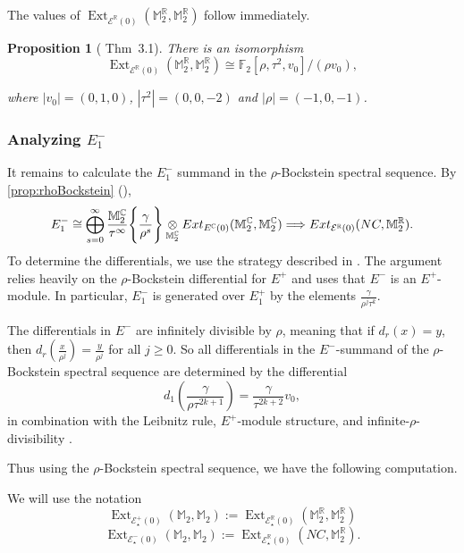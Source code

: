 \documentclass{amsart}
\newtheorem{proposition}[equation]{Proposition}
\theoremstyle{plain}
\numberwithin{equation}{section}
\numberwithin{figure}{section}
\DeclareMathOperator{\Ext}{Ext}
\newcommand{\mC}{{\mathbb C}}
\newcommand{\mF}{{\mathbb F}}
\newcommand{\mM}{{\mathbb M}}
\newcommand{\mR}{{\mathbb R}}
\newcommand{\cE}{{\mathcal E}}
\newcommand{\0}{\langle 0 \rangle }
\begin{document}
The values of $\Ext_{\cE^{\mR}(0)}(\mM_{2}^{\mR}, \mM_{2}^{\mR})$ follow immediately.

\begin{proposition}[\cite{Hill11} Thm~3.1]\label{ext:0:pos} There is an isomorphism
    \[ \Ext_{\cE^{\mR}(0)}(\mM_{2}^{\mR}, \mM_{2}^{\mR}) \cong \mF_{2}[\rho, \tau^{2}, v_{0}]/(\rho v_{0}) ,\]

    where $|v_{0}| = (0,1,0)$, $|\tau^{2}| = (0,0,-2)$ and $|\rho| = (-1,0,-1)$.
\end{proposition}

\subsubsection{Analyzing $E_{1}^{-}$}\label{sec: negative cone HZ}
It remains to calculate the $E_{1}^{-}$ summand in the $\rho$-Bockstein spectral sequence. By \cref{prop:rhoBockstein} (\cite[Proposition~3.1]{GuillouHillIsaksenRavenel2020}), 
\[
E_{1}^{-} \cong \bigoplus\limits_{s=0}^{\infty} \frac{\mM_{2}^{\mC}}{\tau^{\infty}} \Bigg{\{ } \frac{\gamma}{\rho^{s}} \Bigg{ \} } \underset{\mM_{2}^{\mC}}{\otimes} Ext_{E^{\mC}(0)} (\mM_{2}^{\mC}, \mM_{2}^{\mC})   \Longrightarrow Ext_{\cE^{\mR}(0)}(NC, \mM_{2}^{\mR}).
\]
To determine the differentials, we use the strategy described in \cite[\textsection~7.2]{GuillouHillIsaksenRavenel2020}. The argument relies heavily on the $\rho$-Bockstein differential for $E^+$ and uses that $E^{-}$ is an $E^{+}$-module. In particular, $E_{1}^{-}$ is generated over $E_{1}^{+}$ by the elements $\frac{\gamma}{\rho^{j}\tau^{k}}$.

The differentials in $E^{-}$ are infinitely divisible by $\rho$, meaning that if $d_{r}(x) = y$, then $d_{r}(\frac{x}{\rho^{j}}) = \frac{y}{\rho^{j}} $ for all $j \ge 0$. So all differentials in the $E^{-}$-summand of the $\rho$-Bockstein spectral sequence are determined by the differential 
\[
d_{1}\left(\frac{\gamma}{\rho\tau^{2k+1}}\right) = \frac{\gamma}{\tau^{2k+2}}v_{0},
\]
in combination with the Leibnitz rule, $E^{+}$-module structure, and infinite-$\rho$-divisibility \newline \cite[, Proposition 7.7]{GuillouHillIsaksenRavenel2020}.

Thus using the $\rho$-Bockstein spectral sequence, we have the following computation. 

 We will use the notation
\[ \Ext_{\cE^{+}_{\star}(0)}(\mM_{2}, \mM_{2}) := \Ext_{\cE^{\mR}_{\star}(0)}(\mM_{2}^{\mR}, \mM_{2}^{\mR})\]
\[ \Ext_{\cE^{-}_{\star}(0)}(\mM_{2}, \mM_{2}) := \Ext_{\cE^{\mR}_{\star}(0)}(NC, \mM_{2}^{\mR}).\]
\end{document}
